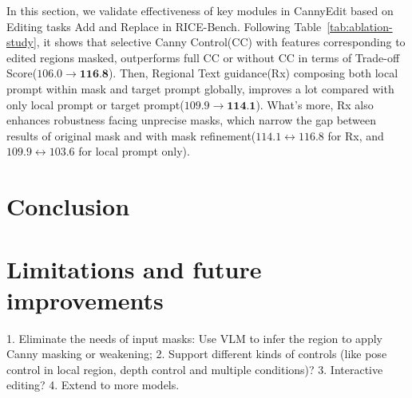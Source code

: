 \documentclass{article}
\begin{document}
In this section, we validate effectiveness of key modules in CannyEdit based on Editing tasks Add and Replace in RICE-Bench. Following Table~\ref{tab:ablation-study}, it shows that selective Canny Control(CC) with features corresponding to edited regions masked, outperforms full CC or without CC in terms of Trade-off Score($106.0\rightarrow \textbf{116.8}$). Then, Regional Text guidance(Rx) composing both local prompt within mask and target prompt globally, improves a lot compared with only local prompt or target prompt($109.9\rightarrow \textbf{114.1}$). What's more, Rx also enhances robustness facing unprecise masks, which narrow the gap between results of original mask and with mask refinement($114.1\leftrightarrow 116.8$ for Rx, and $109.9\leftrightarrow 103.6$ for local prompt only).


\section{Conclusion}

\section{Limitations and future improvements}
\label{Sec:limitation}
1. Eliminate the needs of input masks: Use VLM to infer the region to apply Canny masking or weakening;
2. Support different kinds of controls (like pose control in local region, depth control and multiple conditions)? 
3. Interactive editing?
4. Extend to more models.









\end{document}

